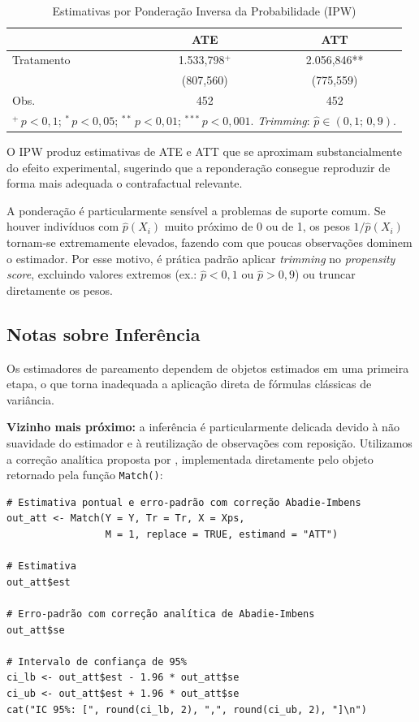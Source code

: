 \documentclass[12pt,a4paper]{article}
\begin{document}
\begin{table}[H]
\centering
\caption{Estimativas por Ponderação Inversa da Probabilidade (IPW)}\label{tab:ipw}
\begin{tabular}{lcc}
\toprule
 & ATE & ATT \\
\midrule
Tratamento \hspace{50mm} & 1.533,798$^+$ & 2.056,846** \\
                          & (807,560) & (775,559) \\
Obs. & 452 & 452 \\
\bottomrule
\multicolumn{3}{l}{\footnotesize $^{+}\,p<0{,}1$;\; $^{*}\,p<0{,}05$;\; $^{**}\,p<0{,}01$;\; $^{***}\,p<0{,}001$. \textit{Trimming}: $\hat{p} \in (0{,}1;\,0{,}9)$.}\\
\end{tabular}
\end{table}

O IPW produz estimativas de ATE e ATT que se aproximam substancialmente do efeito experimental, sugerindo que a reponderação consegue reproduzir de forma mais adequada o contrafactual relevante.

\begin{notabox}
A ponderação é particularmente sensível a problemas de suporte comum. Se houver indivíduos com $\hat{p}(X_i)$ muito próximo de 0 ou de 1, os pesos $1/\hat{p}(X_i)$ tornam-se extremamente elevados, fazendo com que poucas observações dominem o estimador. Por esse motivo, é prática padrão aplicar \textit{trimming} no \textit{propensity score}, excluindo valores extremos (ex.: $\hat{p} < 0{,}1$ ou $\hat{p} > 0{,}9$) ou truncar diretamente os pesos.
\end{notabox}

\subsection{Notas sobre Inferência}

Os estimadores de pareamento dependem de objetos estimados em uma primeira etapa, o que torna inadequada a aplicação direta de fórmulas clássicas de variância.

\textbf{Vizinho mais próximo:} a inferência é particularmente delicada devido à não suavidade do estimador e à reutilização de observações com reposição. Utilizamos a correção analítica proposta por \citet{abadie2006large}, implementada diretamente pelo objeto retornado pela função \texttt{Match()}:

\begin{lstlisting}[style=Rstyle]
# Estimativa pontual e erro-padrão com correção Abadie-Imbens
out_att <- Match(Y = Y, Tr = Tr, X = Xps,
                 M = 1, replace = TRUE, estimand = "ATT")

# Estimativa
out_att$est

# Erro-padrão com correção analítica de Abadie-Imbens
out_att$se

# Intervalo de confiança de 95%
ci_lb <- out_att$est - 1.96 * out_att$se
ci_ub <- out_att$est + 1.96 * out_att$se
cat("IC 95%: [", round(ci_lb, 2), ",", round(ci_ub, 2), "]\n")
\end{lstlisting}
\end{document}
